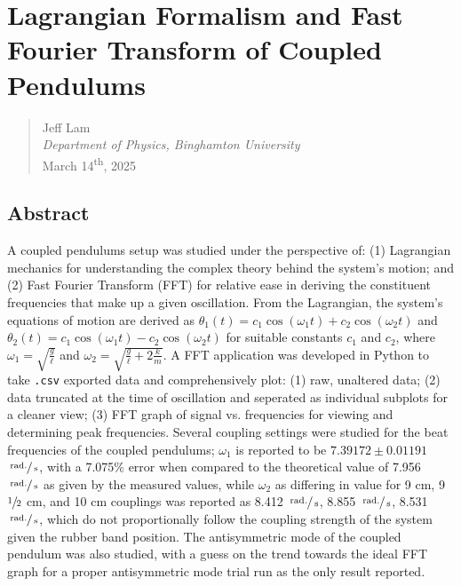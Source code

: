 \documentclass[12pt]{article}
\newcommand{\s}{\;\mathrm{s}}
\newcommand{\radian}{\;\mathrm{rad.}}
\begin{document}

\section*{Lagrangian Formalism and Fast Fourier Transform of Coupled Pendulums}

\begin{quote}
    Jeff Lam \\
    \textit{Department of Physics, Binghamton University} \\
    March 14\textsuperscript{th}, 2025
\end{quote}

\subsection*{Abstract}
A coupled pendulums setup was studied under the perspective of:
(1) Lagrangian mechanics for understanding the complex theory behind the system's motion; and (2) Fast Fourier Transform (FFT) for
relative ease in deriving the constituent frequencies that make up a given oscillation.
From the Lagrangian, the system's equations of motion are derived as $\theta_1(t)=c_1\cos(\omega_1t)+c_2\cos(\omega_2t)$ and $\theta_2(t)=c_1\cos(\omega_1t)-c_2\cos(\omega_2t)$ for suitable constants $c_1$ and $c_2$,
where $\displaystyle{\omega_1=\sqrt{\frac{g}{\ell}}}$ and $\displaystyle{\omega_2=\sqrt{\frac{g}{\ell}+2\frac{k}{m}}}$.
A FFT application was developed in Python to take \texttt{.csv} exported data and comprehensively plot:
(1) raw, unaltered data; (2) data truncated at the time of oscillation and seperated as individual subplots for a cleaner view;
(3) FFT graph of signal vs. frequencies for viewing and determining peak frequencies.
Several coupling settings were studied for the beat frequencies of the coupled pendulums; $\omega_1$ is reported to be $7.39172\pm0.01191$ $\sfrac{\radian}{\s}$,
with a 7.075\% error when compared to the theoretical value of 7.956 $\sfrac{\radian}{\s}$ as given by the measured values,
while $\omega_2$ as differing in value for 9 cm, 9$\sfrac{1}{2}$ cm, and 10 cm couplings was reported as 8.412 $\sfrac{\radian}{\s}$, 8.855 $\sfrac{\radian}{\s}$, 8.531 $\sfrac{\radian}{\s}$,
which do not proportionally follow the coupling strength of the system given the rubber band position.
The antisymmetric mode of the coupled pendulum was also studied, with a guess on the trend towards the ideal FFT graph for a proper antisymmetric mode trial run as the only result reported.
\end{document}
